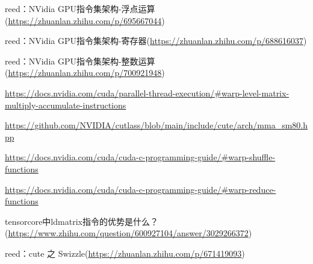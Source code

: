 reed：NVidia GPU指令集架构-浮点运算(\url{https://zhuanlan.zhihu.com/p/695667044})

reed：NVidia GPU指令集架构-寄存器(\url{https://zhuanlan.zhihu.com/p/688616037})

reed：NVidia GPU指令集架构-整数运算(\url{https://zhuanlan.zhihu.com/p/700921948})

\url{https://docs.nvidia.com/cuda/parallel-thread-execution/#warp-level-matrix-multiply-accumulate-instructions}

\url{https://github.com/NVIDIA/cutlass/blob/main/include/cute/arch/mma_sm80.hpp}

\url{https://docs.nvidia.com/cuda/cuda-c-programming-guide/#warp-shuffle-functions}

\url{https://docs.nvidia.com/cuda/cuda-c-programming-guide/#warp-reduce-functions}

tensorcore中ldmatrix指令的优势是什么？(\url{https://www.zhihu.com/question/600927104/answer/3029266372})

reed：cute 之 Swizzle(\url{https://zhuanlan.zhihu.com/p/671419093})

